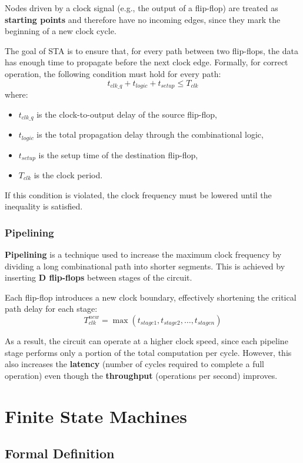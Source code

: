 \documentclass{article}
\begin{document}
Nodes driven by a clock signal (e.g., the output of a flip-flop) are treated as \textbf{starting points} and therefore have no incoming edges, since they mark the beginning of a new clock cycle.

The goal of STA is to ensure that, for every path between two flip-flops, the data has enough time to propagate before the next clock edge.  
Formally, for correct operation, the following condition must hold for every path:
\[
t_{clk\_q} + t_{logic} + t_{setup} \leq T_{clk}
\]
where:
\begin{itemize}
    \item $t_{clk\_q}$ is the clock-to-output delay of the source flip-flop,
    \item $t_{logic}$ is the total propagation delay through the combinational logic,
    \item $t_{setup}$ is the setup time of the destination flip-flop,
    \item $T_{clk}$ is the clock period.
\end{itemize}

If this condition is violated, the clock frequency must be lowered until the inequality is satisfied.

\subsubsection{Pipelining}
\textbf{Pipelining} is a technique used to increase the maximum clock frequency by dividing a long combinational path into shorter segments.  
This is achieved by inserting \textbf{D flip-flops} between stages of the circuit.

Each flip-flop introduces a new clock boundary, effectively shortening the critical path delay for each stage:
\[
T_{clk}^{new} = \max(t_{stage1}, t_{stage2}, \ldots, t_{stagen})
\]

As a result, the circuit can operate at a higher clock speed, since each pipeline stage performs only a portion of the total computation per cycle.  
However, this also increases the \textbf{latency} (number of cycles required to complete a full operation) even though the \textbf{throughput} (operations per second) improves.

\section{Finite State Machines}

\subsection{Formal Definition}
\end{document}
